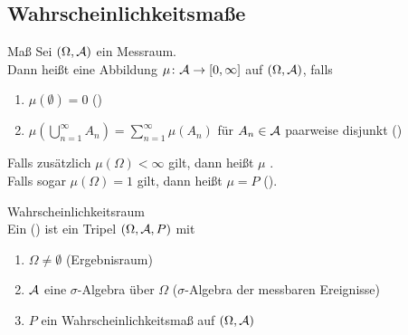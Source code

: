 \subsection{%
    Wahrscheinlichkeitsmaße%
}

\begin{Def}{Maß}
    Sei $(\Omega, \mathcal{A})$ ein Messraum.\\
    Dann heißt eine Abbildung $\mu\colon \mathcal{A} \rightarrow [0, \infty]$ 
    auf $(\Omega, \mathcal{A})$, falls
    \begin{enumerate}
        \item
        $\mu(\emptyset) = 0$ ()
        
        \item
        $\mu(\bigcup_{n=1}^\infty A_n) = \sum_{n=1}^\infty \mu(A_n)$ für
        $A_n \in \mathcal{A}$ paarweise disjunkt ()
    \end{enumerate}
    Falls zusätzlich $\mu(\Omega) < \infty$ gilt, dann heißt $\mu$ .\\
    Falls sogar $\mu(\Omega) = 1$ gilt, dann heißt $\mu = P$ 
    ().
\end{Def}

\begin{Def}{Wahrscheinlichkeitsraum}\\
    Ein  () ist ein Tripel $(\Omega, \mathcal{A}, P)$ mit
    \begin{enumerate}
        \item
        $\Omega \not= \emptyset$ (Ergebnisraum)
        
        \item
        $\mathcal{A}$ eine $\sigma$-Algebra über $\Omega$ ($\sigma$-Algebra der messbaren Ereignisse)
        
        \item
        $P$ ein Wahrscheinlichkeitsmaß auf $(\Omega, \mathcal{A})$
    \end{enumerate}
\end{Def}

\linie
\pagebreak

